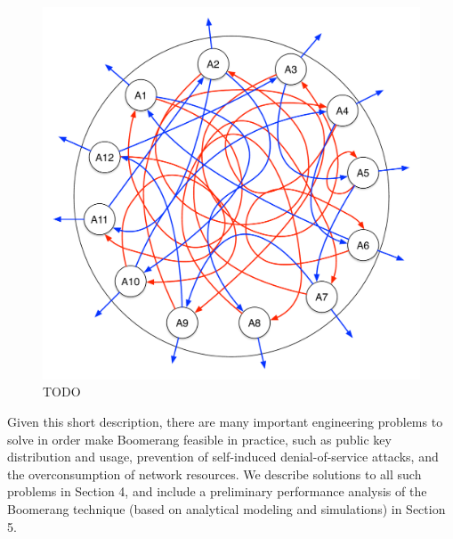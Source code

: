 \begin{figure}[ht!]
\begin{center}
\includegraphics[scale=0.25]{./images/boomerang_net.pdf}
\caption{TODO}
\label{fig:boomerang_net}
\end{center}
\end{figure}

Given this short description, there are many important engineering problems to solve in order make Boomerang feasible in practice, such as public key distribution and usage, prevention of self-induced denial-of-service attacks, and the overconsumption of network resources. We describe solutions to all such problems in Section 4, and include a preliminary performance analysis of the Boomerang technique (based on analytical modeling and simulations) in Section 5. 
